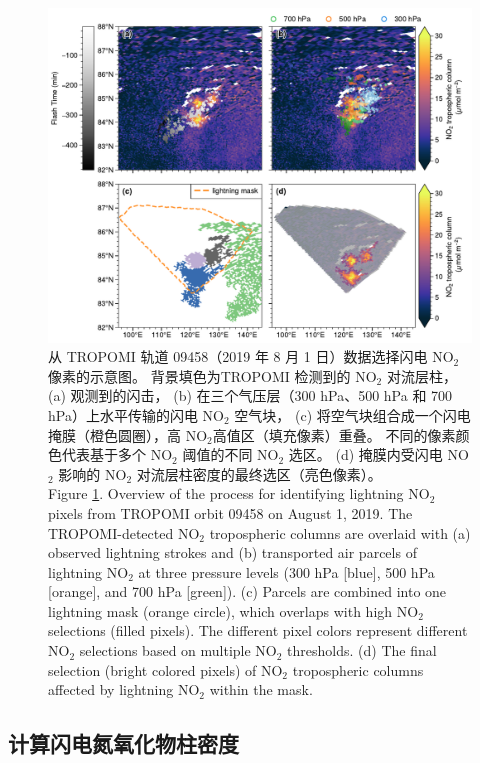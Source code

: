 \begin{figure}[htbp]
\centering
\includegraphics[width=14cm]{./figures/arctic_workflow.pdf}
\caption{
从 TROPOMI 轨道 09458（2019 年 8 月 1 日）数据选择闪电 NO$_2$ 像素的示意图。
背景填色为TROPOMI 检测到的 NO$_2$ 对流层柱， (a) 观测到的闪击，
(b) 在三个气压层（300 hPa、500 hPa 和 700 hPa）上水平传输的闪电 NO$_2$ 空气块，
(c) 将空气块组合成一个闪电掩膜（橙色圆圈），高 NO$_2$高值区（填充像素）重叠。
不同的像素颜色代表基于多个 NO$_2$ 阈值的不同 NO$_2$ 选区。
(d) 掩膜内受闪电 NO$_2$ 影响的 NO$_2$ 对流层柱密度的最终选区（亮色像素）。\\
Figure \ref{fig:workflow}. Overview of the process for identifying lightning NO$_2$ pixels from TROPOMI orbit 09458 on August 1, 2019.
The TROPOMI-detected NO$_2$ tropospheric columns are overlaid with (a) observed lightning strokes and
(b) transported air parcels of lightning NO$_2$ at three pressure levels (300 hPa [blue], 500 hPa [orange], and 700 hPa [green]).
(c) Parcels are combined into one lightning mask (orange circle), which overlaps with high NO$_2$ selections (filled pixels). The different pixel colors represent different NO$_2$ selections based on multiple NO$_2$ thresholds.
(d) The final selection (bright colored pixels) of NO$_2$ tropospheric columns affected by lightning NO$_2$ within the mask.
}
\label{fig:workflow}
\end{figure}

\subsection*{计算闪电氮氧化物柱密度}

